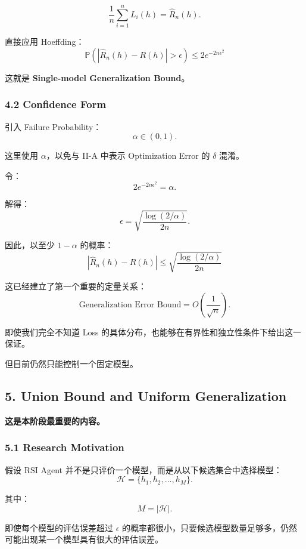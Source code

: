 \[\frac1n\sum_{i=1}^{n}L_i(h)
=
\widehat R_n(h).\]

直接应用 Hoeffding：
\[\boxed{
\mathbb P
\left(
|\widehat R_n(h)-R(h)|>\epsilon
\right)
\leq
2e^{-2n\epsilon^2}
}\]

这就是 \textbf{Single-model Generalization Bound}。

\hypertarget{part-2-14-0001-confidence-form}{%
\subsubsection{4.2 Confidence Form}\label{part-2-14-0001-confidence-form}}

引入 Failure Probability：
\[\alpha\in(0,1).\]

这里使用 \(\alpha\)，以免与 II-A 中表示 Optimization Error 的 \(\delta\) 混淆。

令：
\[2e^{-2n\epsilon^2}=\alpha.\]

解得：
\[\epsilon
=
\sqrt{\frac{\log(2/\alpha)}{2n}}.\]

因此，以至少 \(1-\alpha\) 的概率：
\[\boxed{
|\widehat R_n(h)-R(h)|
\leq
\sqrt{\frac{\log(2/\alpha)}{2n}}
}\]

这已经建立了第一个重要的定量关系：
\[\text{Generalization Error Bound}
=
O\left(\frac1{\sqrt n}\right).\]

即使我们完全不知道 Loss 的具体分布，也能够在有界性和独立性条件下给出这一保证。

但目前仍然只能控制一个固定模型。

\hypertarget{part-2-14-0001-union-bound-and-uniform-generalization}{%
\subsection{5. Union Bound and Uniform Generalization}\label{part-2-14-0001-union-bound-and-uniform-generalization}}

\textbf{这是本阶段最重要的内容。}

\hypertarget{part-2-14-0001-research-motivation}{%
\subsubsection{5.1 Research Motivation}\label{part-2-14-0001-research-motivation}}

假设 RSI Agent 并不是只评价一个模型，而是从以下候选集合中选择模型：
\[\mathcal H=\{h_1,h_2,\ldots,h_M\}.\]

其中：
\[M=|\mathcal H|.\]

即使每个模型的评估误差超过 \(\epsilon\) 的概率都很小，只要候选模型数量足够多，仍然可能出现某一个模型具有很大的评估误差。

